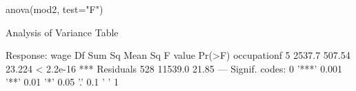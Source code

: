 \begin{Schunk}
\begin{Sinput}
 anova(mod2, test="F")
\end{Sinput}
\begin{Soutput}
Analysis of Variance Table

Response: wage
             Df  Sum Sq Mean Sq F value    Pr(>F)    
occupationf   5  2537.7  507.54  23.224 < 2.2e-16 ***
Residuals   528 11539.0   21.85                      
---
Signif. codes:  0 '***' 0.001 '**' 0.01 '*' 0.05 '.' 0.1 ' ' 1
\end{Soutput}
\end{Schunk}
